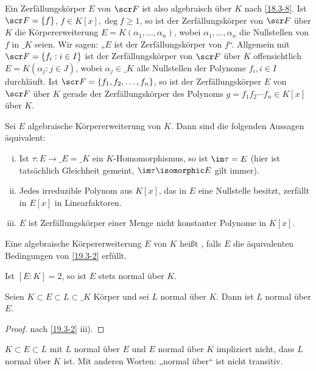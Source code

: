 Ein Zerfällungskörper $E$ von $\scr F$ ist also algebraisch über $K$ nach \ref{18.3-8}.
Ist $\scr F = \{f\}$, $f \in K[x], \deg f \ge 1$, so ist der Zerfällungskörper von $\scr F$ über $K$ die Körpererweiterung $E = K(\alpha_1, \dotsc, \alpha_n)$, wobei $\alpha_1, \dotsc, \alpha_n$ die Nullstellen von $f$ in $\_K$ seien.
Wir sagen: „$E$ ist der Zerfällungskörper von $f$“.
Allgemein mit $\scr F = \{ f_i : i \in I\}$ ist der Zerfällungskörper von $\scr F$ über $K$ offensichtlich $E = K(\alpha_j : j \in J)$, wobei $\alpha_j \in \_K$ alle Nullstellen der Polynome $f_i, i \in I$ durchläuft.
Ist $\scr F = \{ f_1, f_2, \dotsc, f_n \}$, so ist der Zerfällungskörper $E$ von $\scr F$ über $K$ gerade der Zerfällungskörper des Polynoms $g = f_1 f_2 \dotsb f_n \in K[x]$ über $K$.

\begin{st} \label{19.3-2}
	Sei $E$ algebraische Körpererweiterung von $K$.
	Dann sind die folgenden Aussagen äquivalent:
	\begin{enumerate}[i)]
		\item
			Ist $\tau: E \to \_E = \_K$ ein $K$-Homomorphismus, so ist $\im \tau = E$ (hier ist tatsächlich Gleichheit gemeint, $\im \tau \isomorphic E$ gilt immer).
		\item
			Jedes irreduzible Polynom aus $K[x]$, das in $E$ eine Nullstelle besitzt, zerfällt in $E[x]$ in Linearfaktoren.
		\item
			$E$ ist Zerfällungskörper einer Menge nicht konstanter Polynome in $K[x]$.
	\end{enumerate}
\end{st}

\begin{df} \label{19.3-3}
	Eine algebraische Körpererweiterung $E$ von $K$ heißt , falls $E$ die äquivalenten Bedingungen von \ref{19.3-2} erfüllt.
\end{df}

\begin{note}
	Ist $[E : K] = 2$, so ist $E$ stets normal über $K$.
\end{note}

\begin{kor} \label{19.3-4}
	Seien $K \subset E \subset L \subset \_K$ Körper und sei $L$ normal über $K$.
	Dann ist $L$ normal über $E$.
	\begin{proof}
		nach \ref{19.3-2} iii).
	\end{proof}
\end{kor}

\begin{note}
	$K \subset E \subset L$ mit $L$ normal über $E$ und $E$ normal über $K$ impliziert nicht, dass $L$ normal über $K$ ist.
	Mit anderen Worten: „normal über“ ist nicht transitiv.
\end{note}

